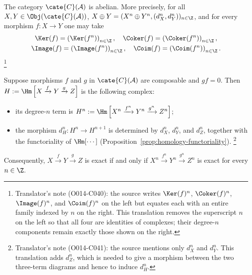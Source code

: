 \begin{proposition}\label{prop:abelian-cat-cplx}
	The category $\cate{C}(\mathcal{A})$ is abelian. More precisely, for all
	$X,Y\in\Obj(\cate{C}(\mathcal{A}))$,
	$X \oplus Y = (X^n \oplus Y^n, (d_X^n, d_Y^n))_{n \in \Z}$, and for
	every morphism $f:X\to Y$ one may take
	\begin{gather*}
		\Ker(f) = \left( \Ker(f^n) \right)_{n \in \Z}, \quad
		\Coker(f) = \left( \Coker(f^n) \right)_{n \in \Z}, \\
		\Image(f) = \left( \Image(f^n) \right)_{n \in \Z}, \quad
		\Coim(f) = \left( \Coim(f^n) \right)_{n \in \Z}.
	\end{gather*}%
	\footnote{Translator's note (O014-C040): the source writes
	$\Ker(f)^n$, $\Coker(f)^n$, $\Image(f)^n$, and $\Coim(f)^n$ on the left
	but equates each with an entire family indexed by $n$ on the right. This
	translation removes the superscript $n$ on the left so that all four are
	identities of complexes; their degree-$n$ components remain exactly those
	shown on the right.}

	Suppose morphisms $f$ and $g$ in $\cate{C}(\mathcal{A})$ are composable
	and $gf=0$. Then
	$H:=\Hm\left[X\xrightarrow{f}Y\xrightarrow{g}Z\right]$ is the following
	complex:
	\begin{itemize}
		\item its degree-$n$ term is
		$H^n:=\Hm\left[X^n\xrightarrow{f^n}Y^n\xrightarrow{g^n}Z^n\right]$;
		\item the morphism $d_H^n:H^n\to H^{n+1}$ is determined by $d_X^n$,
		$d_Y^n$, and $d_Z^n$, together with the functoriality of
		$\Hm[\cdots]$ (Proposition~\ref{prop:homology-functoriality}).%
		\footnote{Translator's note (O014-C041): the source mentions only
		$d_X^n$ and $d_Y^n$. This translation adds $d_Z^n$, which is needed to
		give a morphism between the two three-term diagrams and hence to induce
		$d_H^n$.}
	\end{itemize}
	Consequently, $X\xrightarrow{f}Y\xrightarrow{g}Z$ is exact if and only if
	$X^n\xrightarrow{f^n}Y^n\xrightarrow{g^n}Z^n$ is exact for every
	$n\in\Z$.
\end{proposition}

